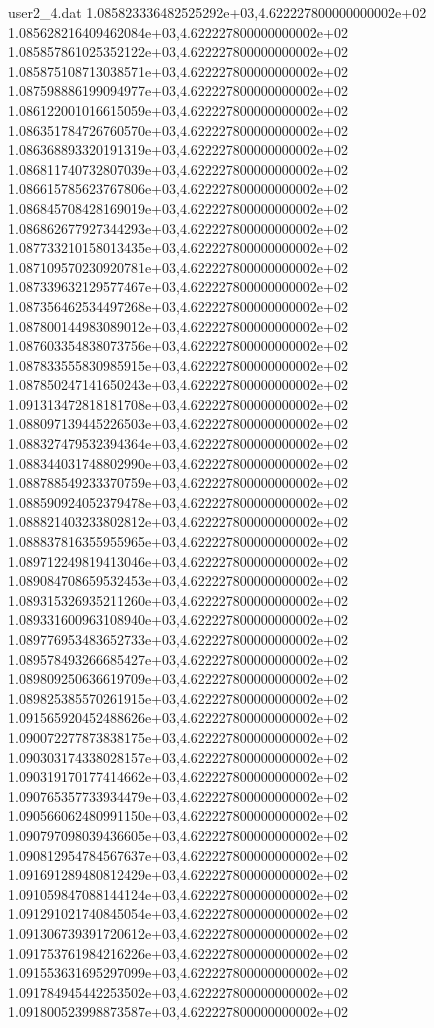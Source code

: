 \begin{filecontents}{user2_4.dat}
1.085823336482525292e+03,4.622227800000000002e+02
1.085628216409462084e+03,4.622227800000000002e+02
1.085857861025352122e+03,4.622227800000000002e+02
1.085875108713038571e+03,4.622227800000000002e+02
1.087598886199094977e+03,4.622227800000000002e+02
1.086122001016615059e+03,4.622227800000000002e+02
1.086351784726760570e+03,4.622227800000000002e+02
1.086368893320191319e+03,4.622227800000000002e+02
1.086811740732807039e+03,4.622227800000000002e+02
1.086615785623767806e+03,4.622227800000000002e+02
1.086845708428169019e+03,4.622227800000000002e+02
1.086862677927344293e+03,4.622227800000000002e+02
1.087733210158013435e+03,4.622227800000000002e+02
1.087109570230920781e+03,4.622227800000000002e+02
1.087339632129577467e+03,4.622227800000000002e+02
1.087356462534497268e+03,4.622227800000000002e+02
1.087800144983089012e+03,4.622227800000000002e+02
1.087603354838073756e+03,4.622227800000000002e+02
1.087833555830985915e+03,4.622227800000000002e+02
1.087850247141650243e+03,4.622227800000000002e+02
1.091313472818181708e+03,4.622227800000000002e+02
1.088097139445226503e+03,4.622227800000000002e+02
1.088327479532394364e+03,4.622227800000000002e+02
1.088344031748802990e+03,4.622227800000000002e+02
1.088788549233370759e+03,4.622227800000000002e+02
1.088590924052379478e+03,4.622227800000000002e+02
1.088821403233802812e+03,4.622227800000000002e+02
1.088837816355955965e+03,4.622227800000000002e+02
1.089712249819413046e+03,4.622227800000000002e+02
1.089084708659532453e+03,4.622227800000000002e+02
1.089315326935211260e+03,4.622227800000000002e+02
1.089331600963108940e+03,4.622227800000000002e+02
1.089776953483652733e+03,4.622227800000000002e+02
1.089578493266685427e+03,4.622227800000000002e+02
1.089809250636619709e+03,4.622227800000000002e+02
1.089825385570261915e+03,4.622227800000000002e+02
1.091565920452488626e+03,4.622227800000000002e+02
1.090072277873838175e+03,4.622227800000000002e+02
1.090303174338028157e+03,4.622227800000000002e+02
1.090319170177414662e+03,4.622227800000000002e+02
1.090765357733934479e+03,4.622227800000000002e+02
1.090566062480991150e+03,4.622227800000000002e+02
1.090797098039436605e+03,4.622227800000000002e+02
1.090812954784567637e+03,4.622227800000000002e+02
1.091691289480812429e+03,4.622227800000000002e+02
1.091059847088144124e+03,4.622227800000000002e+02
1.091291021740845054e+03,4.622227800000000002e+02
1.091306739391720612e+03,4.622227800000000002e+02
1.091753761984216226e+03,4.622227800000000002e+02
1.091553631695297099e+03,4.622227800000000002e+02
1.091784945442253502e+03,4.622227800000000002e+02
1.091800523998873587e+03,4.622227800000000002e+02

\end{filecontents}
